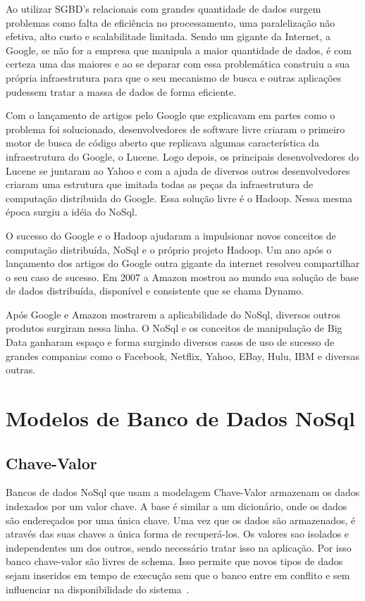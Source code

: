 Ao utilizar SGBD's relacionais com grandes quantidade de dados surgem problemas como falta de eficiência no processamento, uma paralelização não efetiva, alto custo e scalabilitade limitada. Sendo um gigante da Internet, a Google,  se não for a empresa que manipula a maior quantidade de dados, é com certeza uma das maiores e ao se deparar com essa problemática  construiu a sua própria infraestrutura para que o seu mecanismo de busca e outras aplicações pudessem tratar a massa de dados de forma eficiente.

Com o lançamento de artigos pelo Google que explicavam em partes como o problema foi solucionado, desenvolvedores de software livre criaram o primeiro motor de busca de código aberto que replicava algumas característica da infraestrutura do Google, o Lucene. Logo depois, os principais desenvolvedores do Lucene se juntaram ao Yahoo e com a ajuda de diversos outros desenvolvedores criaram uma estrutura que imitada todas as peças da infraestrutura de computação distribuida do 
Google. Essa solução livre é o Hadoop. Nessa mesma época surgiu a idéia do NoSql. 

O sucesso do Google e o Hadoop ajudaram a impulsionar novos conceitos de computação distribuída, NoSql e o próprio projeto Hadoop. Um ano após o lançamento dos artigos do Google outra gigante da internet resolveu compartilhar o seu caso de sucesso. Em 2007 a Amazon mostrou ao mundo sua solução de base de dados distribuída, disponível e consistente que se chama Dynamo.

Após Google e Amazon mostrarem a aplicabilidade do NoSql, diversos
outros produtos surgiram nessa linha. O NoSql e os conceitos de manipulação de Big Data ganharam espaço e forma surgindo diversos casos de uso de sucesso de grandes companias como o Facebook, Netflix, Yahoo, EBay, Hulu, IBM e diversas outras.


\section{Modelos de Banco de Dados NoSql}


\subsection{Chave-Valor}

Bancos de dados NoSql que usam a modelagem Chave-Valor armazenam os dados indexados por um valor chave. A base é similar a um dicionário, onde os dados são endereçados por uma única chave. Uma vez que os dados são armazenados, é através das suas chaves a única forma de recuperá-los. Os valores sao isolados e independentes um dos outros, sendo necessário tratar isso na aplicação. Por isso banco chave-valor são livres de schema. Isso permite que novos tipos de dados sejam inseridos em tempo de execução sem que o banco entre em conflito e sem influenciar na disponibilidade do sistema~\cite{nosqlevaluation,nosqlliveup}.


